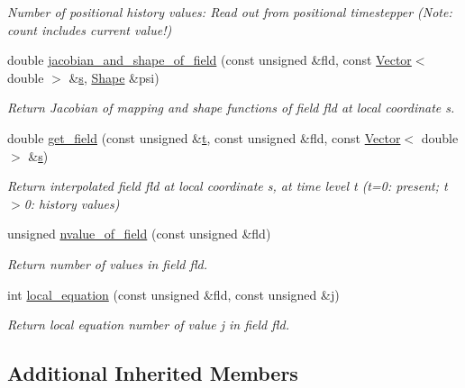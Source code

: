 \begin{DoxyCompactItemize}
\begin{DoxyCompactList}\small\item\em Number of positional history values\+: Read out from positional timestepper (Note\+: count includes current value!) \end{DoxyCompactList}\item 
double \hyperlink{classoomph_1_1ProjectableLinearElasticityElement_a67ba02d25acfba604dbdc3446cab9158}{jacobian\+\_\+and\+\_\+shape\+\_\+of\+\_\+field} (const unsigned \&fld, const \hyperlink{classoomph_1_1Vector}{Vector}$<$ double $>$ \&\hyperlink{cfortran_8h_ab7123126e4885ef647dd9c6e3807a21c}{s}, \hyperlink{classoomph_1_1Shape}{Shape} \&psi)
\begin{DoxyCompactList}\small\item\em Return Jacobian of mapping and shape functions of field fld at local coordinate s. \end{DoxyCompactList}\item 
double \hyperlink{classoomph_1_1ProjectableLinearElasticityElement_a00c02d888df64225d0e0e3e132496094}{get\+\_\+field} (const unsigned \&\hyperlink{cfortran_8h_af6f0bd3dc13317f895c91323c25c2b8f}{t}, const unsigned \&fld, const \hyperlink{classoomph_1_1Vector}{Vector}$<$ double $>$ \&\hyperlink{cfortran_8h_ab7123126e4885ef647dd9c6e3807a21c}{s})
\begin{DoxyCompactList}\small\item\em Return interpolated field fld at local coordinate s, at time level t (t=0\+: present; t$>$0\+: history values) \end{DoxyCompactList}\item 
unsigned \hyperlink{classoomph_1_1ProjectableLinearElasticityElement_ab63ab6edb80671b16a1e9de95de439b1}{nvalue\+\_\+of\+\_\+field} (const unsigned \&fld)
\begin{DoxyCompactList}\small\item\em Return number of values in field fld. \end{DoxyCompactList}\item 
int \hyperlink{classoomph_1_1ProjectableLinearElasticityElement_a0311cfae0d3bf571be30bee3c848543c}{local\+\_\+equation} (const unsigned \&fld, const unsigned \&j)
\begin{DoxyCompactList}\small\item\em Return local equation number of value j in field fld. \end{DoxyCompactList}\end{DoxyCompactItemize}
\subsection*{Additional Inherited Members}


